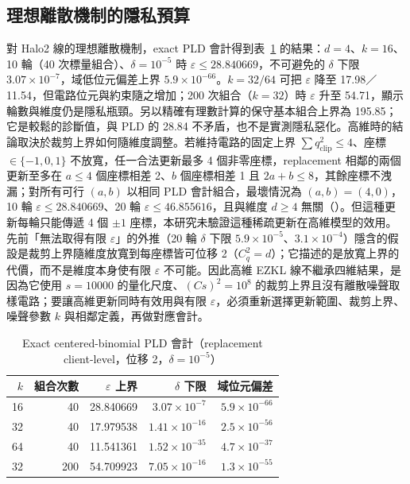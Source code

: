 \documentclass[12pt,a4paper]{article}
\newcommand{\eps}{\varepsilon}
\newcommand{\qclip}{q_{\mathrm{clip}}}
\begin{document}
\subsection{理想離散機制的隱私預算}
\label{sec:privacy}
對 Halo2 線的理想離散機制，exact PLD 會計得到表~\ref{tab:accountant} 的結果：$d=4$、$k=16$、10 輪（40 次標量組合）、$\delta=10^{-5}$ 時 $\eps\le 28.840669$，不可避免的 $\delta$ 下限 $3.07\times10^{-7}$，域低位元偏差上界 $5.9\times10^{-66}$。$k=32/64$ 可把 $\eps$ 降至 17.98／11.54，但電路位元與約束隨之增加；200 次組合（$k=32$）時 $\eps$ 升至 54.71，顯示輪數與維度仍是隱私瓶頸。另以精確有理數計算的保守基本組合上界為 195.85；它是較鬆的診斷值，與 PLD 的 28.84 不矛盾，也不是實測隱私惡化。高維時的結論取決於裁剪上界如何隨維度調整。若維持電路的固定上界 $\sum\qclip^2\le4$、座標 $\in\{-1,0,1\}$ 不放寬，任一合法更新最多 4 個非零座標，replacement 相鄰的兩個更新至多在 $a\le4$ 個座標相差 2、$b$ 個座標相差 1 且 $2a+b\le8$，其餘座標不洩漏；對所有可行 $(a,b)$ 以相同 PLD 會計組合，最壞情況為 $(a,b)=(4,0)$，10 輪 $\eps\le28.840669$、20 輪 $\eps\le46.855616$，且與維度 $d\ge4$ 無關（）。但這種更新每輪只能傳遞 4 個 $\pm1$ 座標，本研究未驗證這種稀疏更新在高維模型的效用。先前「無法取得有限 $\eps$」的外推（20 輪 $\delta$ 下限 $5.9\times10^{-5}$、$3.1\times10^{-4}$）隱含的假設是裁剪上界隨維度放寬到每座標皆可位移 2（$C_q^2=d$）；它描述的是放寬上界的代價，而不是維度本身使有限 $\eps$ 不可能。因此高維 EZKL 線不繼承四維結果，是因為它使用 $s=10000$ 的量化尺度、$(Cs)^2=10^8$ 的裁剪上界且沒有離散噪聲取樣電路；要讓高維更新同時有效用與有限 $\eps$，必須重新選擇更新範圍、裁剪上界、噪聲參數 $k$ 與相鄰定義，再做對應會計。

\begin{table}[H]
\centering\small
\caption{Exact centered-binomial PLD 會計（replacement client-level，位移 2，$\delta=10^{-5}$）}
\label{tab:accountant}
\begin{tabular}{rrrrr}
\toprule
$k$ & 組合次數 & $\eps$ 上界 & $\delta$ 下限 & 域位元偏差 \\
\midrule
16 & 40 & 28.840669 & $3.07\times10^{-7}$ & $5.9\times10^{-66}$ \\
32 & 40 & 17.979538 & $1.41\times10^{-16}$ & $2.5\times10^{-56}$ \\
64 & 40 & 11.541361 & $1.52\times10^{-35}$ & $4.7\times10^{-37}$ \\
32 & 200 & 54.709923 & $7.05\times10^{-16}$ & $1.3\times10^{-55}$ \\
\bottomrule
\end{tabular}
\end{table}
\end{document}
